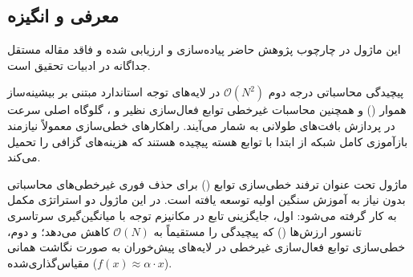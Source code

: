 \subsection{معرفی و انگیزه}
این ماژول در چارچوب پژوهش حاضر پیاده‌سازی و ارزیابی شده و فاقد مقاله مستقل جداگانه در ادبیات تحقیق است.

پیچیدگی محاسباتی درجه دوم $\mathcal{O}(N^2)$ در لایه‌های توجه استاندارد مبتنی بر بیشینه‌ساز هموار () و همچنین محاسبات غیرخطی توابع فعال‌سازی نظیر  و ، گلوگاه اصلی سرعت در پردازش بافت‌های طولانی به شمار می‌آیند. راهکارهای خطی‌سازی معمولاً نیازمند بازآموزی کامل شبکه از ابتدا با توابع هسته پیچیده هستند که هزینه‌های گزافی را تحمیل می‌کند.

ماژول  تحت عنوان ترفند خطی‌سازی توابع () برای حذف فوری غیرخطی‌های محاسباتی بدون نیاز به آموزش سنگین اولیه توسعه یافته است. در این ماژول دو استراتژی مکمل به کار گرفته می‌شود: اول، جایگزینی تابع  در مکانیزم توجه با میانگین‌گیری سرتاسری تانسور ارزش‌ها () که پیچیدگی را مستقیماً به $\mathcal{O}(N)$ کاهش می‌دهد؛ و دوم، خطی‌سازی توابع فعال‌سازی غیرخطی در لایه‌های پیش‌خوران به صورت نگاشت همانی مقیاس‌گذاری‌شده ($f(x) \approx \alpha \cdot x$).
